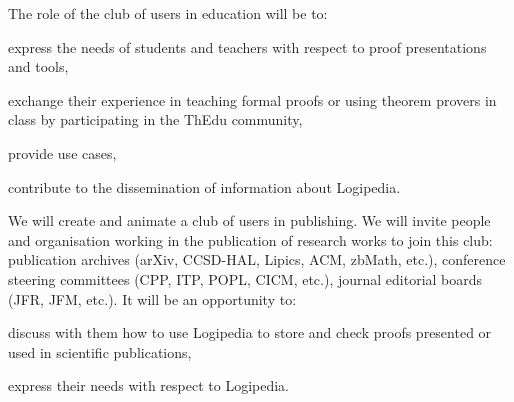 \begin{workpackage}[id=dissemination,type=MGT,wphases=1-48,
  short={Dissemination},
  title={Dissemination, communication and exploitation},
  lead=Lie,LieRM=3,InrRM=6,BirRM=4,CleRM=2,ImtRM=2,StrRM=2,ZibRM=14,EduRM=12]
\begin{tasklist}
\begin{task}[id=teachers-club,
      title=Expanding the use of Logipedia in education,
      shorttitle=Educ.,
      lead=Str,StrRM=2,wphases=1-48!.05]

    The role of the club of users in education will be to:
    \begin{compactitem}
    \item express the needs of students and teachers with respect to proof
      presentations and tools,
    \item exchange their experience in teaching formal proofs or using
      theorem provers in class by participating in the ThEdu community,
    \item provide use cases,
    \item contribute to the dissemination of information about Logipedia.
    \end{compactitem}

  \end{task}

  \begin{task}[id=publishers-club,
      title=Expanding the use of Logipedia in publishing,
      shorttitle=Pub.,
      lead=Zib,ZibRM=2,wphases=1-48!.05]
    We will create and animate a club of users in publishing. We will invite
    people and organisation working in the publication of research
    works to join this club: publication archives (arXiv, CCSD-HAL,
    Lipics, ACM, zbMath, etc.), conference steering committees (CPP,
    ITP, POPL, CICM, etc.), journal editorial boards (JFR, JFM,
    etc.). It will be an opportunity to:
    \begin{compactitem}
    \item discuss with them how to use Logipedia to store and check
      proofs presented or used in scientific publications,
    \item express their needs with respect to Logipedia.
    \end{compactitem}
  \end{task}


\end{tasklist}
\end{workpackage}

